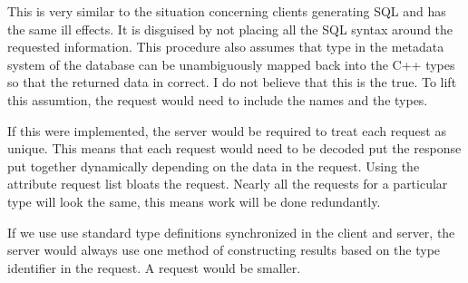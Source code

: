 This is very similar to the situation concerning clients generating
SQL and has the same ill effects.  It is disguised by not placing 
all the SQL syntax around the requested information.  This procedure
also assumes that type in the metadata system of the database
can be unambiguously mapped back into the C++ types so that the 
returned data in correct.  I do not believe that this is the true.
To lift this assumtion, the request would need to include the
names and the types.

If this were implemented, the server would be required to treat each
request as unique.  This means that each request would need to be
decoded put the response put together dynamically depending on the
data in the request.  Using the attribute request list bloats the request.
Nearly all the requests for a particular type will look the same, this
means work will be done redundantly.

If we use use standard type definitions synchronized in the client and
server, the server would always use one method of constructing
results based on the type identifier in the request.  A request would
be smaller.

